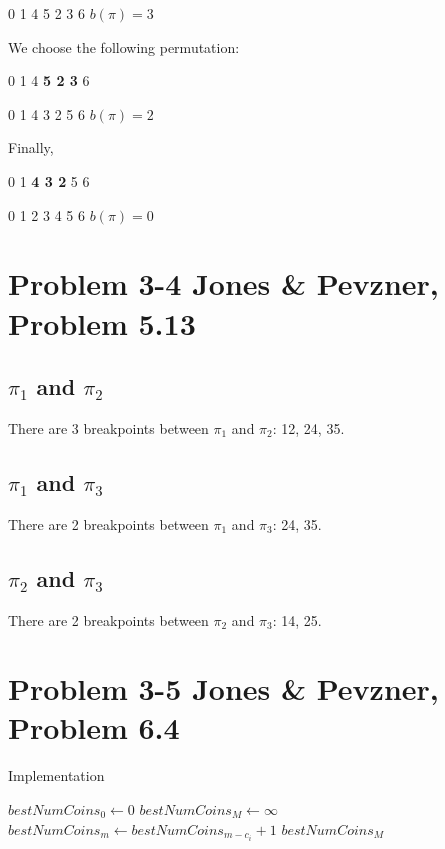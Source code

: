 \documentclass{article}
\begin{document}
\begin{center}
0 1 4 5 2 3 6 $b(\pi) = 3$
\end{center}

We choose the following permutation:

\begin{center}
0 1 4 \textbf{5 2 3} 6

0 1 4 3 2 5 6 $b(\pi) = 2$
\end{center}

Finally,

\begin{center}
0 1 \textbf{4 3 2} 5 6

0 1 2 3 4 5 6 $b(\pi) = 0$
\end{center}

\section*{Problem 3-4 Jones \& Pevzner, Problem 5.13}

\subsection*{$\pi_1$ and $\pi_2$}

There are 3 breakpoints between $\pi_1$ and $\pi_2$: 12, 24, 35.

\subsection*{$\pi_1$ and $\pi_3$}

There are 2 breakpoints between $\pi_1$ and $\pi_3$: 24, 35.

\subsection*{$\pi_2$ and $\pi_3$}

There are 2 breakpoints between $\pi_2$ and $\pi_3$: 14, 25.

\section*{Problem 3-5 Jones \& Pevzner, Problem 6.4}

\begin{algorithm}[H]
\caption{Implementation}
\begin{algorithmic}[1]
 \State $bestNumCoins_0 \leftarrow 0$
 \State $bestNumCoins_M \leftarrow \infty$
     \State $bestNumCoins_m \leftarrow bestNumCoins_{m-c_i} + 1$
    \EndIf
   \EndIf
  \EndFor
 \EndFor
 \State \Return $bestNumCoins_M$
\EndFunction
\end{algorithmic}
\end{algorithm}
\end{document}
